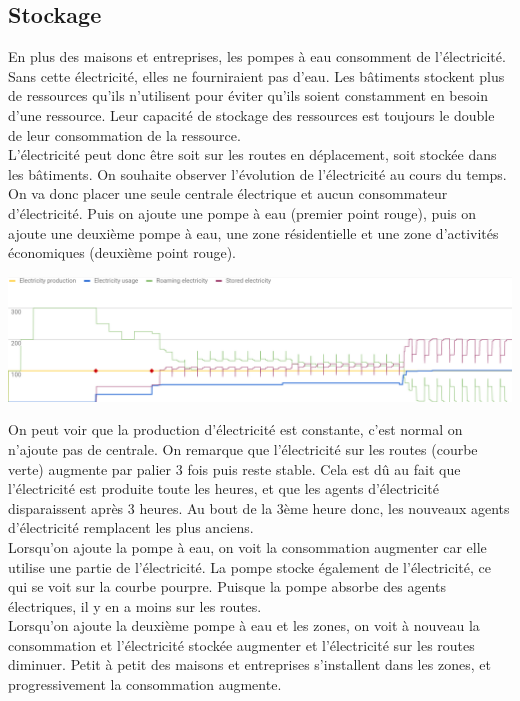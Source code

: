 \documentclass[11pt]{report}
\begin{document}
\subsection{Stockage}
En plus des maisons et entreprises, les pompes à eau consomment de l'électricité. Sans cette électricité, elles ne fourniraient pas d'eau.
Les bâtiments stockent plus de ressources qu'ils n’utilisent pour éviter qu'ils soient constamment en besoin d'une ressource. Leur capacité de stockage des ressources est toujours le double de leur consommation de la ressource.\\
L'électricité peut donc être soit sur les routes en déplacement, soit stockée dans les bâtiments. On souhaite observer l'évolution de l'électricité au cours du temps. On va donc placer une seule centrale électrique et aucun consommateur d'électricité. Puis on ajoute une pompe à eau (premier point rouge), puis on ajoute une deuxième pompe à eau, une zone résidentielle et une zone d'activités économiques (deuxième point rouge).
\begin{center}
	\includegraphics[width=\textwidth]{electricity_storage}
\end{center}
On peut voir que la production d'électricité est constante, c'est normal on n'ajoute pas de centrale.
On remarque que l'électricité sur les routes (courbe verte) augmente par palier 3 fois puis reste stable. Cela est dû au fait que l'électricité est produite toute les heures, et que les agents d'électricité disparaissent après 3 heures. Au bout de la 3ème heure donc, les nouveaux agents d'électricité remplacent les plus anciens.\\
Lorsqu'on ajoute la pompe à eau, on voit la consommation augmenter car elle utilise une partie de l'électricité. La pompe stocke également de l'électricité, ce qui se voit sur la courbe pourpre. Puisque la pompe absorbe des agents électriques, il y en a moins sur les routes.\\
Lorsqu'on ajoute la deuxième pompe à eau et les zones, on voit à nouveau la consommation et l'électricité stockée augmenter et l'électricité sur les routes diminuer. Petit à petit des maisons et entreprises s'installent dans les zones, et progressivement la consommation augmente.
\end{document}

